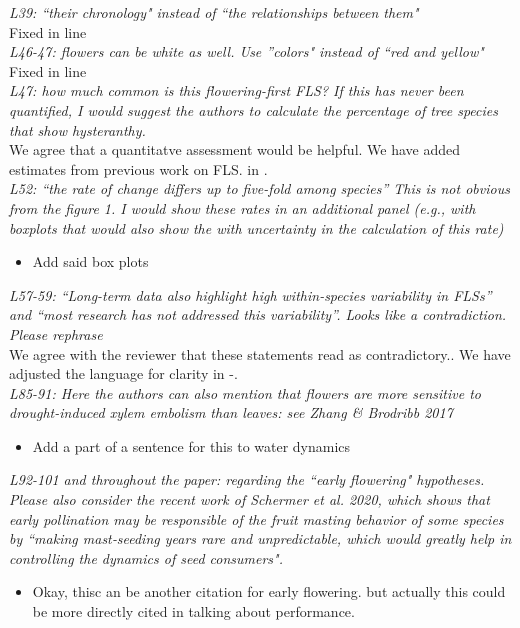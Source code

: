 \documentclass{article}[11pt]
\begin{document}
\emph{L39: ``their chronology" instead of ``the relationships between them"}\\
Fixed in line \\
\emph{L46-47: flowers can be white as well. Use ''colors" instead of ``red and yellow"}\\
Fixed in line \\
\emph{L47: how much common is this flowering-first FLS? If this has never been quantified, I would suggest the authors to calculate the percentage of tree species that show hysteranthy.} \\
We agree that a quantitatve assessment would be helpful. We have added estimates from previous work on FLS. \citep{Gougerthy2018} in .\\
\emph{L52: “the rate of change differs up to five-fold among species” This is not obvious from the figure 1. I would show these rates in an additional panel (e.g., with boxplots that would also show the with uncertainty in the calculation of this rate)}
\begin{itemize}
\item Add said box plots
\end{itemize}
\emph{L57-59: “Long-term data also highlight high within-species variability in FLSs” and “most research has not addressed this variability”. Looks like a contradiction. Please rephrase}\\
We agree with the reviewer that these statements read as contradictory.. We have adjusted the language for clarity in -.\\
\emph{L85-91: Here the authors can also mention that flowers are more sensitive to drought-induced xylem embolism than leaves: see Zhang & Brodribb 2017}
\begin{itemize}
\item Add a part of a sentence for this to water dynamics
\end{itemize}
\emph{L92-101 and throughout the paper: regarding the ``early flowering" hypotheses. Please also consider the recent work of Schermer et al. 2020, which shows that early pollination may be responsible of the fruit masting behavior of some species by ``making mast‐seeding years rare and unpredictable, which would greatly help in controlling the dynamics of seed consumers".}
\begin{itemize}
\item Okay, thisc an be another citation for early flowering. but actually this could be more directly cited in talking about performance.
\end{itemize}
\end{document}
